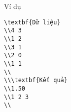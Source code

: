Ví dụ
\begin{verbatim}
\textbf{Dữ liệu}
\\4 3
\\1 2
\\3 1
\\2 0
\\1 1
\\
\\\textbf{Kết quả}
\\1.50
\\1 2 3
\\\end{verbatim}